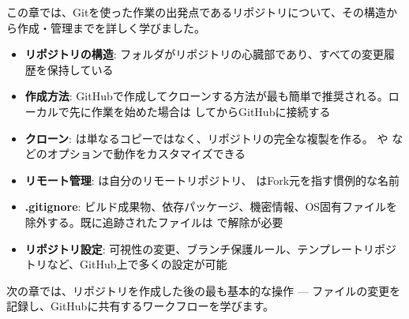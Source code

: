 この章では、Gitを使った作業の出発点であるリポジトリについて、その構造から作成・管理までを詳しく学びました。

\begin{itemize}
  \item \textbf{リポジトリの構造}:  フォルダがリポジトリの心臓部であり、すべての変更履歴を保持している
  \item \textbf{作成方法}: GitHubで作成してクローンする方法が最も簡単で推奨される。ローカルで先に作業を始めた場合は  してからGitHubに接続する
  \item \textbf{クローン}:  は単なるコピーではなく、リポジトリの完全な複製を作る。 や  などのオプションで動作をカスタマイズできる
  \item \textbf{リモート管理}:  は自分のリモートリポジトリ、 はFork元を指す慣例的な名前
  \item \textbf{.gitignore}: ビルド成果物、依存パッケージ、機密情報、OS固有ファイルを除外する。既に追跡されたファイルは  で解除が必要
  \item \textbf{リポジトリ設定}: 可視性の変更、ブランチ保護ルール、テンプレートリポジトリなど、GitHub上で多くの設定が可能
\end{itemize}

次の章では、リポジトリを作成した後の最も基本的な操作 — ファイルの変更を記録し、GitHubに共有するワークフローを学びます。
